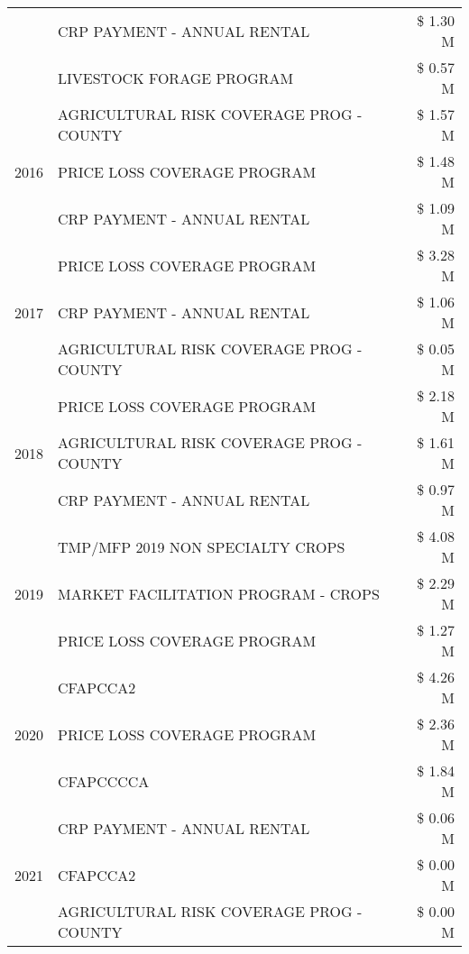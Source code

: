 \begin{tabular}{llr}
 & CRP PAYMENT - ANNUAL RENTAL & \$ 1.30 M \\
 & LIVESTOCK FORAGE PROGRAM & \$ 0.57 M \\
\cline{1-3}
\multirow[t]{3}{*}{2016} & AGRICULTURAL RISK COVERAGE PROG - COUNTY & \$ 1.57 M \\
 & PRICE LOSS COVERAGE PROGRAM & \$ 1.48 M \\
 & CRP PAYMENT - ANNUAL RENTAL & \$ 1.09 M \\
\cline{1-3}
\multirow[t]{3}{*}{2017} & PRICE LOSS COVERAGE PROGRAM & \$ 3.28 M \\
 & CRP PAYMENT - ANNUAL RENTAL & \$ 1.06 M \\
 & AGRICULTURAL RISK COVERAGE PROG - COUNTY & \$ 0.05 M \\
\cline{1-3}
\multirow[t]{3}{*}{2018} & PRICE LOSS COVERAGE PROGRAM & \$ 2.18 M \\
 & AGRICULTURAL RISK COVERAGE PROG - COUNTY & \$ 1.61 M \\
 & CRP PAYMENT - ANNUAL RENTAL & \$ 0.97 M \\
\cline{1-3}
\multirow[t]{3}{*}{2019} & TMP/MFP 2019 NON SPECIALTY CROPS & \$ 4.08 M \\
 & MARKET FACILITATION PROGRAM - CROPS & \$ 2.29 M \\
 & PRICE LOSS COVERAGE PROGRAM & \$ 1.27 M \\
\cline{1-3}
\multirow[t]{3}{*}{2020} & CFAPCCA2 & \$ 4.26 M \\
 & PRICE LOSS COVERAGE PROGRAM & \$ 2.36 M \\
 & CFAPCCCCA & \$ 1.84 M \\
\cline{1-3}
\multirow[t]{3}{*}{2021} & CRP PAYMENT - ANNUAL RENTAL & \$ 0.06 M \\
 & CFAPCCA2 & \$ 0.00 M \\
 & AGRICULTURAL RISK COVERAGE PROG - COUNTY & \$ 0.00 M \\
\cline{1-3}
\bottomrule
\end{tabular}
